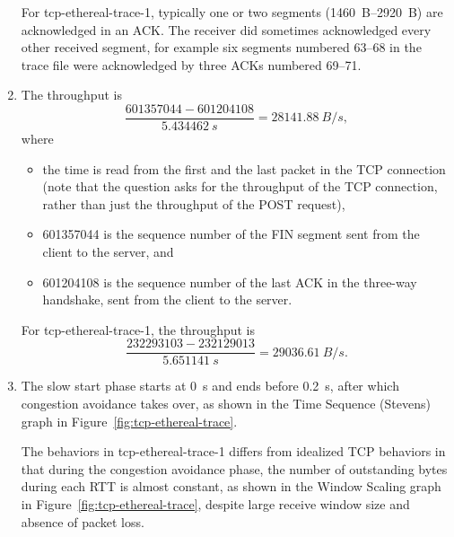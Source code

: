 \documentclass{article}
\begin{document}
\begin{enumerate}
    For tcp-ethereal-trace-1, typically one or two segments (\SIrange{1460}{2920}{B}) are acknowledged in an ACK. The receiver did sometimes acknowledged every other received segment, for example six segments numbered 63--68 in the trace file were acknowledged by three ACKs numbered 69--71.

    \item The throughput is
    \[
        \frac{\num{601357044} - \num{601204108}}{\SI{5.434462}{s}} = \SI{28141.88}{B/s},
    \]
    where
    \begin{itemize}
        \item the time is read from the first and the last packet in the TCP connection (note that the question asks for the throughput of the TCP connection, rather than just the throughput of the POST request),
        \item \num{601357044} is the sequence number of the FIN segment sent from the client to the server, and
        \item \num{601204108} is the sequence number of the last ACK in the three-way handshake, sent from the client to the server.
    \end{itemize}

    For tcp-ethereal-trace-1, the throughput is
    \[
        \frac{\num{232293103} - \num{232129013}}{\SI{5.651141}{s}} = \SI{29036.61}{B/s}.
    \]
    
    \item The slow start phase starts at \SI{0}{s} and ends before \SI{0.2}{s}, after which congestion avoidance takes over, as shown in the Time Sequence (Stevens) graph in Figure~\ref{fig:tcp-ethereal-trace}.
    
    The behaviors in tcp-ethereal-trace-1 differs from idealized TCP behaviors in that during the congestion avoidance phase, the number of outstanding bytes during each RTT is almost constant,  as shown in the Window Scaling graph in Figure~\ref{fig:tcp-ethereal-trace}, despite large receive window size and absence of packet loss.
    

\end{enumerate}
\end{document}
